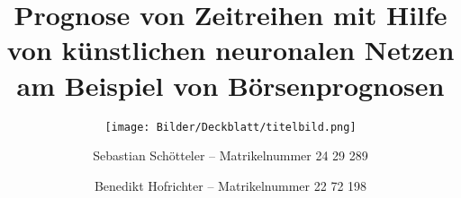 \subject{\Huge Seminararbeit}

\title{Prognose von Zeitreihen mit Hilfe von künstlichen neuronalen Netzen am Beispiel von Börsenprognosen}

\author{Sebastian Schötteler -- Matrikelnummer 24 29 289 \and Benedikt Hofrichter -- Matrikelnummer 22 72 198}

\subtitle{\bigskip\bigskip\texttt{[image: Bilder/Deckblatt/titelbild.png]}\bigskip\bigskip} 

\publishers{\texttt{[image: Bilder/Deckblatt/TH-Logo.jpg]}}

\maketitle